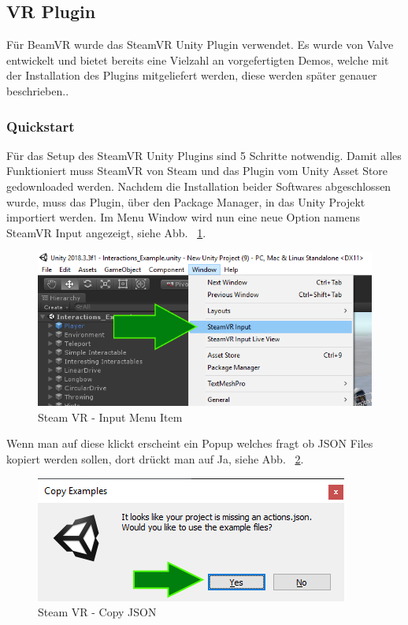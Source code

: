 \subsection{VR Plugin}
Für BeamVR wurde das SteamVR Unity Plugin verwendet.
Es wurde von Valve entwickelt und bietet bereits eine Vielzahl an vorgefertigten Demos, welche mit der Installation des Plugins mitgeliefert werden, diese werden später genauer beschrieben..
~\cite{SteamVR_Overview_2022}

\subsubsection{Quickstart}
Für das Setup des SteamVR Unity Plugins sind 5 Schritte notwendig.
Damit alles Funktioniert muss SteamVR von Steam und das Plugin vom Unity Asset Store gedownloaded werden.
Nachdem die Installation beider Softwares abgeschlossen wurde, muss das Plugin, über den Package Manager, in das Unity Projekt importiert werden.
Im Menu Window wird nun eine neue Option namens SteamVR Input angezeigt, siehe Abb. ~\ref{fig:steamvr_input_menu_item}.
\begin {figure}
    \centering
    \includegraphics[scale=0.9]{pics/steamVR_Input_MenuItem}
    \caption{Steam VR - Input Menu Item}
    \label{fig:steamvr_input_menu_item}
\end {figure}
Wenn man auf diese klickt erscheint ein Popup welches fragt ob JSON Files kopiert werden sollen, dort drückt man auf Ja, siehe Abb. ~\ref{fig:steamvr_copy_json}.
\begin {figure}
    \centering
    \includegraphics[scale=1]{pics/steamVR_Input_CopyJSON}
    \caption{Steam VR - Copy JSON}
    \label{fig:steamvr_copy_json}
\end {figure}
